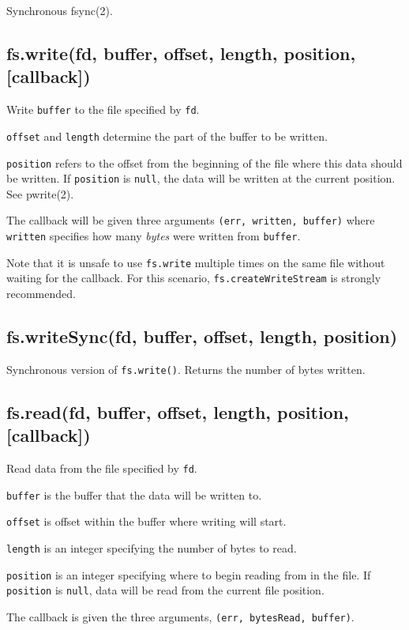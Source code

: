Synchronous fsync(2).

\subsection{fs.write(fd, buffer, offset, length, position,
{[}callback{]})}

Write \texttt{buffer} to the file specified by \texttt{fd}.

\texttt{offset} and \texttt{length} determine the part of the buffer to
be written.

\texttt{position} refers to the offset from the beginning of the file
where this data should be written. If \texttt{position} is
\texttt{null}, the data will be written at the current position. See
pwrite(2).

The callback will be given three arguments
\texttt{(err, written, buffer)} where \texttt{written} specifies how
many \emph{bytes} were written from \texttt{buffer}.

Note that it is unsafe to use \texttt{fs.write} multiple times on the
same file without waiting for the callback. For this scenario,
\texttt{fs.createWriteStream} is strongly recommended.

\subsection{fs.writeSync(fd, buffer, offset, length, position)}

Synchronous version of \texttt{fs.write()}. Returns the number of bytes
written.

\subsection{fs.read(fd, buffer, offset, length, position,
{[}callback{]})}

Read data from the file specified by \texttt{fd}.

\texttt{buffer} is the buffer that the data will be written to.

\texttt{offset} is offset within the buffer where writing will start.

\texttt{length} is an integer specifying the number of bytes to read.

\texttt{position} is an integer specifying where to begin reading from
in the file. If \texttt{position} is \texttt{null}, data will be read
from the current file position.

The callback is given the three arguments,
\texttt{(err, bytesRead, buffer)}.

